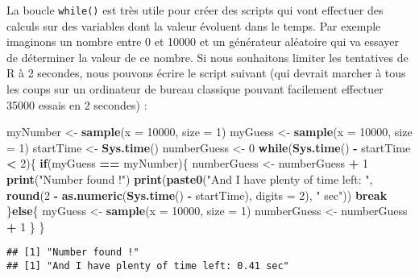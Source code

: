 \documentclass[]{book}
\newenvironment{Shaded}{\begin{snugshade}}{\end{snugshade}}
\newcommand{\KeywordTok}[1]{\textcolor[rgb]{0.13,0.29,0.53}{\textbf{#1}}}
\newcommand{\DataTypeTok}[1]{\textcolor[rgb]{0.13,0.29,0.53}{#1}}
\newcommand{\DecValTok}[1]{\textcolor[rgb]{0.00,0.00,0.81}{#1}}
\newcommand{\StringTok}[1]{\textcolor[rgb]{0.31,0.60,0.02}{#1}}
\newcommand{\ControlFlowTok}[1]{\textcolor[rgb]{0.13,0.29,0.53}{\textbf{#1}}}
\newcommand{\OperatorTok}[1]{\textcolor[rgb]{0.81,0.36,0.00}{\textbf{#1}}}
\newcommand{\NormalTok}[1]{#1}
\theoremstyle{definition}
\theoremstyle{definition}
\theoremstyle{definition}
\theoremstyle{remark}
\begin{document}
La boucle \texttt{while()} est très utile pour créer des scripts qui
vont effectuer des calculs sur des variables dont la valeur évoluent
dans le temps. Par exemple imaginons un nombre entre 0 et 10000 et un
générateur aléatoire qui va essayer de déterminer la valeur de ce
nombre. Si nous souhaitons limiter les tentatives de R à 2 secondes,
nous pouvons écrire le script suivant (qui devrait marcher à tous les
coups sur un ordinateur de bureau classique pouvant facilement effectuer
35000 essais en 2 secondes) :

\begin{Shaded}
\begin{Highlighting}[]
\NormalTok{myNumber <-}\StringTok{ }\KeywordTok{sample}\NormalTok{(}\DataTypeTok{x =} \DecValTok{10000}\NormalTok{, }\DataTypeTok{size =} \DecValTok{1}\NormalTok{)}
\NormalTok{myGuess <-}\StringTok{ }\KeywordTok{sample}\NormalTok{(}\DataTypeTok{x =} \DecValTok{10000}\NormalTok{, }\DataTypeTok{size =} \DecValTok{1}\NormalTok{)}
\NormalTok{startTime <-}\StringTok{ }\KeywordTok{Sys.time}\NormalTok{()}
\NormalTok{numberGuess <-}\StringTok{ }\DecValTok{0}
\ControlFlowTok{while}\NormalTok{(}\KeywordTok{Sys.time}\NormalTok{() }\OperatorTok{-}\StringTok{ }\NormalTok{startTime }\OperatorTok{<}\StringTok{ }\DecValTok{2}\NormalTok{)\{}
  \ControlFlowTok{if}\NormalTok{(myGuess }\OperatorTok{==}\StringTok{ }\NormalTok{myNumber)\{}
\NormalTok{    numberGuess <-}\StringTok{ }\NormalTok{numberGuess }\OperatorTok{+}\StringTok{ }\DecValTok{1}
    \KeywordTok{print}\NormalTok{(}\StringTok{"Number found !"}\NormalTok{)}
    \KeywordTok{print}\NormalTok{(}\KeywordTok{paste0}\NormalTok{(}\StringTok{"And I have plenty of time left: "}\NormalTok{, }
      \KeywordTok{round}\NormalTok{(}\DecValTok{2} \OperatorTok{-}\StringTok{ }\KeywordTok{as.numeric}\NormalTok{(}\KeywordTok{Sys.time}\NormalTok{() }\OperatorTok{-}\StringTok{ }\NormalTok{startTime), }\DataTypeTok{digits =} \DecValTok{2}\NormalTok{), }
      \StringTok{" sec"}\NormalTok{))}
    \ControlFlowTok{break}
\NormalTok{  \}}\ControlFlowTok{else}\NormalTok{\{}
\NormalTok{    myGuess <-}\StringTok{ }\KeywordTok{sample}\NormalTok{(}\DataTypeTok{x =} \DecValTok{10000}\NormalTok{, }\DataTypeTok{size =} \DecValTok{1}\NormalTok{)}
\NormalTok{    numberGuess <-}\StringTok{ }\NormalTok{numberGuess }\OperatorTok{+}\StringTok{ }\DecValTok{1}
\NormalTok{  \}}
\NormalTok{\}}
\end{Highlighting}
\end{Shaded}

\begin{verbatim}
## [1] "Number found !"
## [1] "And I have plenty of time left: 0.41 sec"
\end{verbatim}
\end{document}
